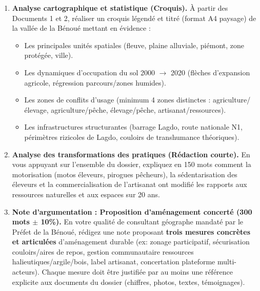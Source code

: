 \documentclass[11pt]{article}
\newcounter{popsec}
\newcounter{popsub}
\newcommand{\courssub}[1]{%
  \stepcounter{popsub}%
  \par\vspace{9pt}\noindent{\popxbold\fontsize{11.5}{13}\selectfont\color{popink}{\color{poporange}\thepopsec.\thepopsub}\hspace{6pt}#1}\par\nopagebreak\vspace{4pt}
}
\begin{document}
\courssub{Consignes}
\begin{enumerate}
    \item \textbf{Analyse cartographique et statistique (Croquis).} À partir des Documents 1 et 2, réaliser un croquis légendé et titré (format A4 paysage) de la vallée de la Bénoué mettant en évidence :
    \begin{itemize}
        \item Les principales unités spatiales (fleuve, plaine alluviale, piémont, zone protégée, ville).
        \item Les dynamiques d'occupation du sol 2000 $\rightarrow$ 2020 (flèches d'expansion agricole, régression parcours/zones humides).
        \item Les zones de conflits d'usage (minimum 4 zones distinctes : agriculture/élevage, agriculture/pêche, élevage/pêche, artisanat/ressources).
        \item Les infrastructures structurantes (barrage Lagdo, route nationale N1, périmètres rizicoles de Lagdo, couloirs de transhumance théoriques).
    \end{itemize}
    \item \textbf{Analyse des transformations des pratiques (Rédaction courte).} En vous appuyant sur l'ensemble du dossier, expliquez en 150 mots comment la motorisation (motos éleveurs, pirogues pêcheurs), la sédentarisation des éleveurs et la commercialisation de l'artisanat ont modifié les rapports aux ressources naturelles et aux espaces sur 20 ans.
    \item \textbf{Note d'argumentation : Proposition d'aménagement concerté (300 mots $\pm$ 10\%).} En votre qualité de consultant géographe mandaté par le Préfet de la Bénoué, rédigez une note proposant \textbf{trois mesures concrètes et articulées} d'aménagement durable (ex: zonage participatif, sécurisation couloirs/aires de repos, gestion communautaire ressources halieutiques/argile/bois, label artisanat, concertation plateforme multi-acteurs). Chaque mesure doit être justifiée par au moins une référence explicite aux documents du dossier (chiffres, photos, textes, témoignages).
\end{enumerate}
\end{document}

